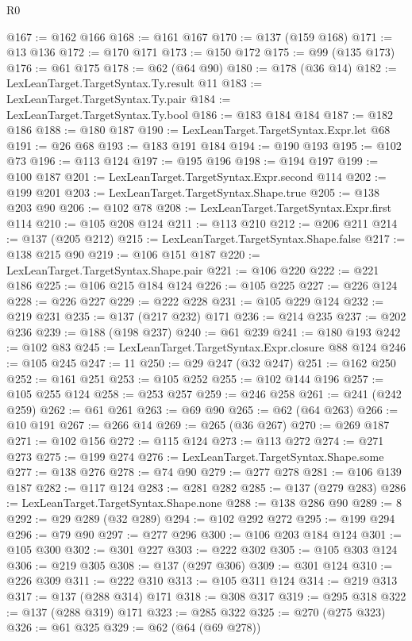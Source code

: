 \begin{lexlean}{R0}
\begin{coremodule}
@167 := @162 @166
@168 := @161 @167
@170 := @137 (@159 @168)
@171 := @13 @136
@172 := @170 @171
@173 := @150 @172
@175 := @99 (@135 @173)
@176 := @61 @175
@178 := @62 (@64 @90)
@180 := @178 (@36 @14)
@182 := LexLeanTarget.TargetSyntax.Ty.result @11
@183 := LexLeanTarget.TargetSyntax.Ty.pair
@184 := LexLeanTarget.TargetSyntax.Ty.bool
@186 := @183 @184 @184
@187 := @182 @186
@188 := @180 @187
@190 := LexLeanTarget.TargetSyntax.Expr.let @68
@191 := @26 @68
@193 := @183 @191 @184
@194 := @190 @193
@195 := @102 @73
@196 := @113 @124
@197 := @195 @196
@198 := @194 @197
@199 := @100 @187
@201 := LexLeanTarget.TargetSyntax.Expr.second @114
@202 := @199 @201
@203 := LexLeanTarget.TargetSyntax.Shape.true
@205 := @138 @203 @90
@206 := @102 @78
@208 := LexLeanTarget.TargetSyntax.Expr.first @114
@210 := @105 @208 @124
@211 := @113 @210
@212 := @206 @211
@214 := @137 (@205 @212)
@215 := LexLeanTarget.TargetSyntax.Shape.false
@217 := @138 @215 @90
@219 := @106 @151 @187
@220 := LexLeanTarget.TargetSyntax.Shape.pair
@221 := @106 @220
@222 := @221 @186
@225 := @106 @215 @184 @124
@226 := @105 @225
@227 := @226 @124
@228 := @226 @227
@229 := @222 @228
@231 := @105 @229 @124
@232 := @219 @231
@235 := @137 (@217 @232) @171
@236 := @214 @235
@237 := @202 @236
@239 := @188 (@198 @237)
@240 := @61 @239
@241 := @180 @193
@242 := @102 @83
@245 := LexLeanTarget.TargetSyntax.Expr.closure @88 @124
@246 := @105 @245
@247 := 11
@250 := @29 @247 (@32 @247)
@251 := @162 @250
@252 := @161 @251
@253 := @105 @252
@255 := @102 @144 @196
@257 := @105 @255 @124
@258 := @253 @257
@259 := @246 @258
@261 := @241 (@242 @259)
@262 := @61 @261
@263 := @69 @90
@265 := @62 (@64 @263)
@266 := @10 @191
@267 := @266 @14
@269 := @265 (@36 @267)
@270 := @269 @187
@271 := @102 @156
@272 := @115 @124
@273 := @113 @272
@274 := @271 @273
@275 := @199 @274
@276 := LexLeanTarget.TargetSyntax.Shape.some
@277 := @138 @276
@278 := @74 @90
@279 := @277 @278
@281 := @106 @139 @187
@282 := @117 @124
@283 := @281 @282
@285 := @137 (@279 @283)
@286 := LexLeanTarget.TargetSyntax.Shape.none
@288 := @138 @286 @90
@289 := 8
@292 := @29 @289 (@32 @289)
@294 := @102 @292 @272
@295 := @199 @294
@296 := @79 @90
@297 := @277 @296
@300 := @106 @203 @184 @124
@301 := @105 @300
@302 := @301 @227
@303 := @222 @302
@305 := @105 @303 @124
@306 := @219 @305
@308 := @137 (@297 @306)
@309 := @301 @124
@310 := @226 @309
@311 := @222 @310
@313 := @105 @311 @124
@314 := @219 @313
@317 := @137 (@288 @314) @171
@318 := @308 @317
@319 := @295 @318
@322 := @137 (@288 @319) @171
@323 := @285 @322
@325 := @270 (@275 @323)
@326 := @61 @325
@329 := @62 (@64 (@69 @278))

\end{coremodule}
\end{lexlean}
